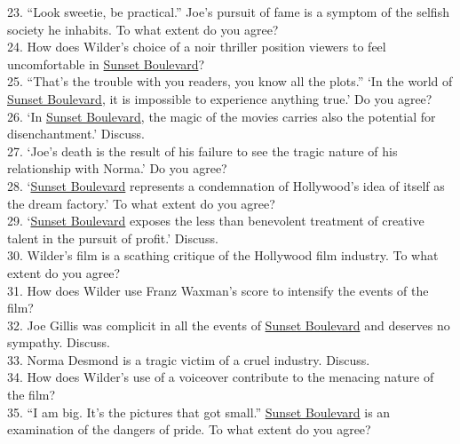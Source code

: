 \documentclass[a4paper]{article}
\begin{document}
23. “Look sweetie, be practical.” Joe’s pursuit of fame is a symptom of the selfish society he inhabits. To what extent do you agree?\\

24. How does Wilder’s choice of a noir thriller position viewers to feel uncomfortable in \underline{Sunset Boulevard}?\\

25. “That’s the trouble with you readers, you know all the plots.” ‘In the world of \underline{Sunset Boulevard}, it is impossible to experience anything true.’ Do you agree?\\

26. ‘In \underline{Sunset Boulevard}, the magic of the movies carries also the potential for disenchantment.’ Discuss.\\

27. ‘Joe’s death is the result of his failure to see the tragic nature of his relationship with Norma.’ Do you agree?\\

28. ‘\underline{Sunset Boulevard} represents a condemnation of Hollywood’s idea of itself as the dream factory.’ To what extent do you agree?\\

29. ‘\underline{Sunset Boulevard} exposes the less than benevolent treatment of creative talent in the pursuit of profit.’ Discuss.\\

30. Wilder’s film is a scathing critique of the Hollywood film industry. To what extent do you agree?\\

31. How does Wilder use Franz Waxman’s score to intensify the events of the film?\\

32. Joe Gillis was complicit in all the events of \underline{Sunset Boulevard} and deserves no sympathy. Discuss.\\

33. Norma Desmond is a tragic victim of a cruel industry. Discuss.\\

34. How does Wilder’s use of a voiceover contribute to the menacing nature of the film?\\

35. “I am big. It’s the pictures that got small.” \underline{Sunset Boulevard} is an examination of the dangers of pride. To what extent do you agree?\\
\end{document}
